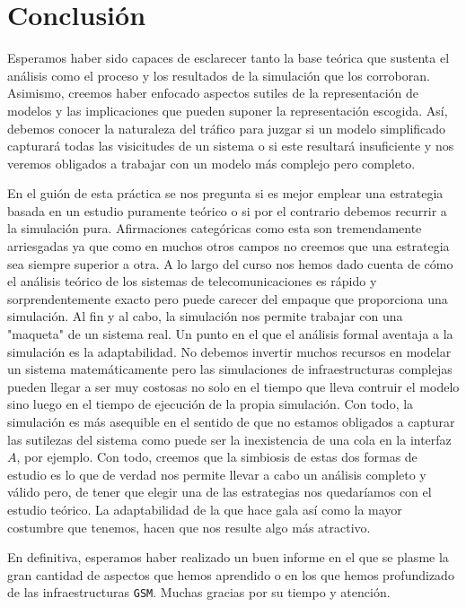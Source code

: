 \documentclass[10pt]{article}
\begin{document}
	\section{Conclusión}
		Esperamos haber sido capaces de esclarecer tanto la base teórica que sustenta el análisis como el proceso y los resultados de la simulación que los corroboran.
		Asimismo, creemos haber enfocado aspectos sutiles de la representación de modelos y las implicaciones que pueden suponer la representación escogida. Así, debemos conocer la naturaleza del tráfico para juzgar si un modelo simplificado capturará todas las visicitudes de un sistema o si este resultará insuficiente y nos veremos obligados a trabajar con un modelo más complejo pero completo.

		En el guión de esta práctica se nos pregunta si es mejor emplear una estrategia basada en un estudio puramente teórico o si por el contrario debemos recurrir a la simulación pura. Afirmaciones categóricas como esta son tremendamente arriesgadas ya que como en muchos otros campos no creemos que una estrategia sea siempre superior a otra. A lo largo del curso nos hemos dado cuenta de cómo el análisis teórico de los sistemas de telecomunicaciones es rápido y sorprendentemente exacto pero puede carecer del empaque que proporciona una simulación. Al fin y al cabo, la simulación nos permite trabajar con una "maqueta" de un sistema real. Un punto en el que el análisis formal aventaja a la simulación es la adaptabilidad. No debemos invertir muchos recursos en modelar un sistema matemáticamente pero las simulaciones de infraestructuras complejas pueden llegar a ser muy costosas no solo en el tiempo que lleva contruir el modelo sino luego en el tiempo de ejecución de la propia simulación. Con todo, la simulación es más asequible en el sentido de que no estamos obligados a capturar las sutilezas del sistema como puede ser la inexistencia de una cola en la interfaz $A$, por ejemplo. Con todo, creemos que la simbiosis de estas dos formas de estudio es lo que de verdad nos permite llevar a cabo un análisis completo y válido pero, de tener que elegir una de las estrategias nos quedaríamos con el estudio teórico. La adaptabilidad de la que hace gala así como la mayor costumbre que tenemos, hacen que nos resulte algo más atractivo.

		En definitiva, esperamos haber realizado un buen informe en el que se plasme la gran cantidad de aspectos que hemos aprendido o en los que hemos profundizado de las infraestructuras \texttt{GSM}. Muchas gracias por su tiempo y atención.
\end{document}
